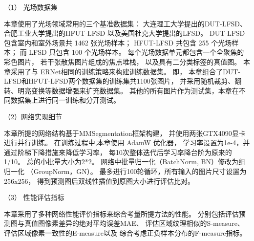 


（1）
光场数据集


本章使用了光场领域常用的三个基准数据集：
大连理工大学提出的DUT-LFSD、
合肥工业大学提出的HFUT-LFSD
以及美国杜克大学提出的LFSD。
DUT-LFSD 包含室内和室外场景共 1462 张光场样本；
HFUT-LFSD 共包含 255 个光场样本；
而 LFSD 只包含 100 个光场样本。
每个光场数据单元都包含一个全聚焦的彩色图片，
若干张散焦图片组成的焦点堆栈，
以及具有二分类标签的真值图。
本章采用了与 ERNet相同的训练策略来构建训练数据集。
即，
本章组合了DUT-LFSD和HFUT-LFSD两个数据集的训练集共1100张图片，
并采用随机裁剪、翻转、明亮变换等数据增强来扩充数据集。
其他的所有图片作为测试集，本章在不同数据集上进行同一训练和分开测试。



（2）网络实现细节


本章所提的网络结构基于MMSegmentation框架构建，
并使用两张GTX4090显卡进行并行训练。
在训练过程中,本章使用 AdamW 优化器，
学习率设置为1e-4，并通过阶梯下降措施来降低学习率，
每10次整体迭代后学习率降台阶为原来的1/10。
总的小批量大小为2*2。
网络中批量归一化（BatchNorm, BN）修改为组
归一化 （GroupNorm，GN）。
最多进行100轮循环，所有输入的图片尺寸设置为 256x256，
得到预测图后双线性插值到原图大小进行评估比对。



（3）
性能评估指标


本章采用了多种网络性能评价指标来综合考量所提方法的性能。
分别包括评估预测图与真值图像素差异的绝对平均误差MAE、
评估区域纹理相似的S-measure、
评估区域像素一致性的E-measure以及
综合考虑正负样本分布的F-measure指标。






